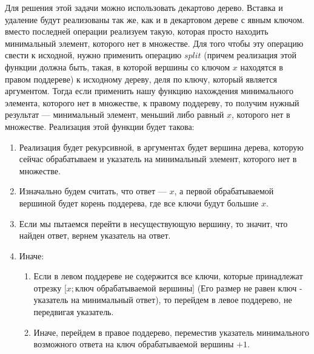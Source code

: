 \documentclass[a4paper,12pt]{article}
\begin{document}
\par Для решения этой задачи можно использовать декартово дерево. Вставка и удаление будут реализованы так же, как и в декартовом дереве с явным ключом.  вместо последней операции реализуем такую, которая просто находить минимальный элемент, которого нет в множестве. Для того чтобы эту операцию свести к исходной, нужно применить операцию $split$ (причем реализация этой функции должна быть, такая, в которой вершины со ключом $x$ находятся в правом поддереве) к исходному дереву, деля по ключу, который является аргументом. Тогда если применить нашу функцию нахождения минимального элемента, которого нет в множестве, к правому поддереву, то получим нужный результат --- минимальный элемент, меньший либо равный $x$, которого нет в множестве. Реализация этой функции будет такова:
\begin{enumerate}
\item Реализация будет рекурсивной, в аргументах будет вершина дерева, которую сейчас обрабатываем и указатель на минимальный элемент, которого нет в множестве.
\item Изначально будем считать, что ответ --- $x$, а первой обрабатываемой вершиной будет корень поддерева, где все ключи будут большие $x$.
\item Если мы пытаемся перейти в несуществующую вершину, то значит, что найден ответ, вернем указатель на ответ.
\item Иначе: 
\begin{enumerate}
\item Если в левом поддереве не содержится все ключи, которые принадлежат отрезку $[x;$ключ обрабатываемой вершины$]$ (Его размер не равен ключ - указатель на минимальный ответ), то перейдем в левое поддерево, не передвигая указатель.
\item Иначе, перейдем в правое поддерево, переместив указатель минимального возможного ответа на ключ обрабатываемой вершины $+ 1$.
\end{enumerate}
\end{enumerate}
\end{document}

